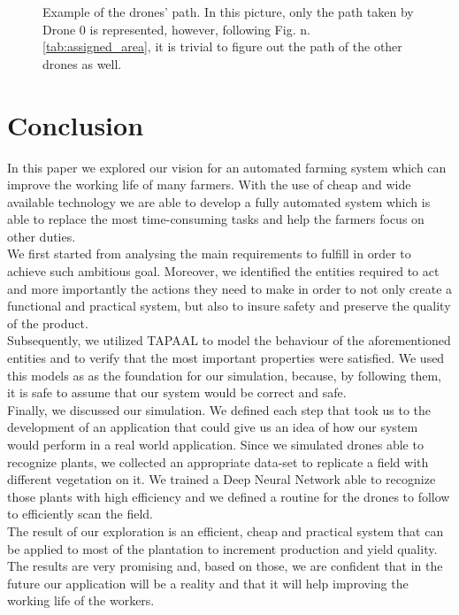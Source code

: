\documentclass[english]{lni}
\begin{document}
\begin{figure}
\caption{Example of the drones' path. In this picture, only the path taken by Drone 0 is represented, however, following Fig. n. \ref{tab:assigned_area}, it is trivial to figure out the path of the other drones as well. }
\label{fig:grid_path}
\end{figure}

\newpage
\section{Conclusion}
In this paper we explored our vision for an automated farming system which can improve the working life of many farmers. With the use of cheap and wide available technology we are able to develop a fully automated system which is able to replace the most time-consuming tasks and help the farmers focus on other duties. \\
We first started from analysing the main requirements to fulfill in order to achieve such ambitious goal. Moreover, we identified the entities required to act and more importantly the actions they need to make in order to not only create a functional and practical system, but also to insure safety and preserve the quality of the product. \\
Subsequently, we utilized TAPAAL to model the behaviour of the aforementioned entities and to verify that the most important properties were satisfied. We used this models as as the foundation for our simulation, because, by following them, it is safe to assume that our system would be correct and safe. \\
Finally, we discussed our simulation. We defined each step that took us to the development of an application that could give us an idea of how our system would perform in a real world application. Since we simulated drones able to recognize plants, we collected an appropriate data-set to replicate a field with different vegetation on it. We trained a Deep Neural Network able to recognize those plants with high efficiency and we defined a routine for the drones to follow to efficiently scan the field. \\
The result of our exploration is an efficient, cheap and practical system that can be applied to most of the plantation to increment production and yield quality. The results are very promising and, based on those, we are confident that in the future our application will be a reality and that it will help improving the working life of the workers.
\end{document}
